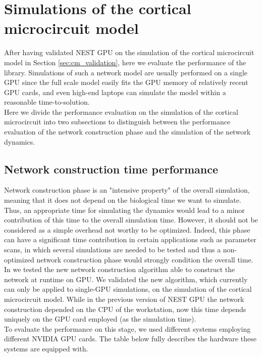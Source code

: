 \documentclass[a4paper, 12pt, twoside, openright]{book}
\begin{document}
\section{Simulations of the cortical microcircuit model}
After having validated NEST GPU on the simulation of the cortical microcircuit model in Section \ref{sec:cm_validation}, here we evaluate the performance of the library. Simulations of such a network model are usually performed on a single GPU since the full scale model easily fits the GPU memory of relatively recent GPU cards, and even high-end laptops can simulate the model within a reasonable time-to-solution.\\
Here we divide the performance evaluation on the simulation of the cortical microcircuit into two subsections to distinguish between the performance evaluation of the network construction phase and the simulation of the network dynamics.

\subsection{Network construction time performance}
Network construction phase is an "intensive property" of the overall simulation, meaning that it does not depend on the biological time we want to simulate. Thus, an appropriate time for simulating the dynamics would lead to a minor contribution of this time to the overall simulation time. However, it should not be considered as a simple overhead not worthy to be optimized. Indeed, this phase can have a significant time contribution in certain applications such as parameter scans, in which several simulations are needed to be tested and thus a non-optimized network construction phase would strongly condition the overall time.\\
In \cite{Golosio2023} we tested the new network construction algorithm able to construct the network at runtime on GPU. We validated the new algorithm, which currently can only be applied to single-GPU simulations, on the simulation of the cortical microcircuit model. While in the previous version of NEST GPU the network construction depended on the CPU of the workstation, now this time depends uniquely on the GPU card employed (as the simulation time).\\
To evaluate the performance on this stage, we used different systems employing different NVIDIA GPU cards. The table below fully describes the hardware these systems are equipped with.
\end{document}
